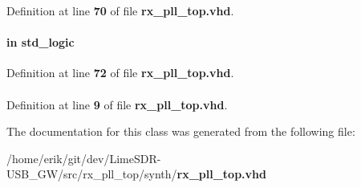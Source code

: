 Definition at line {\bf 70} of file {\bf rx\+\_\+pll\+\_\+top.\+vhd}.

\paragraph[{smpl\+\_\+cmp\+\_\+error}]{ {\bfseries \textcolor{keywordflow}{in}\textcolor{vhdlchar}{ }} {\bfseries \textcolor{comment}{std\+\_\+logic}\textcolor{vhdlchar}{ }} \hspace{0.3cm}{\ttfamily [Port]}}\label{classrx__pll__top_ab89caaf9e342c725af6f87ac27d615ef}


Definition at line {\bf 72} of file {\bf rx\+\_\+pll\+\_\+top.\+vhd}.

\paragraph[{std\+\_\+logic\+\_\+1164}]{\hspace{0.3cm}{\ttfamily [Package]}}\label{classrx__pll__top_acd03516902501cd1c7296a98e22c6fcb}


Definition at line {\bf 9} of file {\bf rx\+\_\+pll\+\_\+top.\+vhd}.



The documentation for this class was generated from the following file\+:\begin{DoxyCompactItemize}
\item 
/home/erik/git/dev/\+Lime\+S\+D\+R-\/\+U\+S\+B\+\_\+\+G\+W/src/rx\+\_\+pll\+\_\+top/synth/{\bf rx\+\_\+pll\+\_\+top.\+vhd}\end{DoxyCompactItemize}
